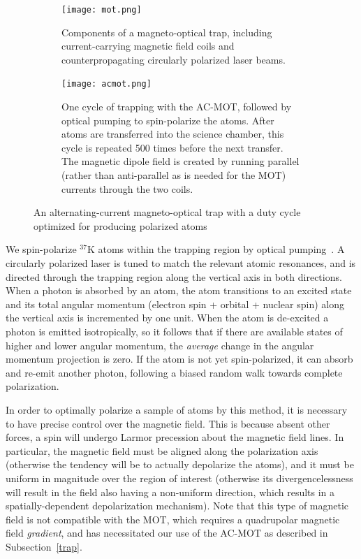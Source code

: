 \begin{figure}[ht]
\centering
	\begin{subfigure}[t]{0.242\textwidth}
		\centering
		\texttt{[image: mot.png]}
		\caption{Components of a magneto-optical trap, including current-carrying magnetic field coils and counterpropagating circularly polarized laser beams.}
		\label{fig:mot}
	\end{subfigure}
	\hfill
	\begin{subfigure}[t]{0.728\textwidth}
		\centering
		\texttt{[image: acmot.png]}
		\caption{One cycle of trapping with the AC-MOT, followed by optical pumping to spin-polarize the atoms.  After atoms are transferred into the science chamber, this cycle is repeated 500 times before the next transfer.  The magnetic dipole field is created by running parallel (rather than anti-parallel as is needed for the MOT) currents through the two coils.}
		\label{fig:acmot}
	\end{subfigure}
	\caption{An alternating-current magneto-optical trap with a duty cycle optimized for producing polarized atoms}	
	\label{fig:themot}
\color{black}
\end{figure}


We spin-polarize $^{37}\textrm{K}$ atoms within the trapping region by optical pumping~\cite{ben_OP}.  A circularly polarized laser is tuned to match the relevant atomic resonances, and is directed through the trapping region along the vertical axis in both directions.  When a photon is absorbed by an atom, the atom transitions to an excited state and its total angular momentum (electron spin + orbital + nuclear spin) along the vertical axis is incremented by one unit.  When the atom is de-excited a photon is emitted isotropically, 
so it follows that if there are available states of higher and lower angular momentum, the \emph{average} change in the angular momentum projection is zero.  If the atom is not yet spin-polarized, it can absorb and re-emit another photon, following a biased random walk towards complete polarization.  

In order to optimally polarize a sample of atoms by this method, it is necessary to have precise control over the magnetic field.  This is because absent other forces, a spin will undergo Larmor precession about the magnetic field lines.  In particular, the magnetic field must be aligned along the polarization axis (otherwise the tendency will be to actually depolarize the atoms), and it must be uniform in magnitude over the region of interest (otherwise its divergencelessness will result in the field also having a non-uniform direction, which results in a spatially-dependent depolarization mechanism).  Note that this type of magnetic field is not compatible with the MOT, which requires a quadrupolar magnetic field \emph{gradient}, and has necessitated our use of the AC-MOT as described in Subsection~\ref{trap}.


